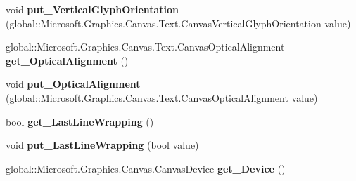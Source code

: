 \begin{DoxyCompactItemize}
\item 
\mbox{\label{class_microsoft_1_1_graphics_1_1_canvas_1_1_text_1_1_canvas_text_layout_a45f5e962fa229c96404257c75c6a3a3c}} 
void {\bfseries put\+\_\+\+Vertical\+Glyph\+Orientation} (global\+::\+Microsoft.\+Graphics.\+Canvas.\+Text.\+Canvas\+Vertical\+Glyph\+Orientation value)
\item 
\mbox{\label{class_microsoft_1_1_graphics_1_1_canvas_1_1_text_1_1_canvas_text_layout_a9de04b11cf865c89c4a76010e49b21ac}} 
global\+::\+Microsoft.\+Graphics.\+Canvas.\+Text.\+Canvas\+Optical\+Alignment {\bfseries get\+\_\+\+Optical\+Alignment} ()
\item 
\mbox{\label{class_microsoft_1_1_graphics_1_1_canvas_1_1_text_1_1_canvas_text_layout_af03396a3ef4783d99224c7d1ed1fb4c8}} 
void {\bfseries put\+\_\+\+Optical\+Alignment} (global\+::\+Microsoft.\+Graphics.\+Canvas.\+Text.\+Canvas\+Optical\+Alignment value)
\item 
\mbox{\label{class_microsoft_1_1_graphics_1_1_canvas_1_1_text_1_1_canvas_text_layout_aa574a94412591998ea88bcf6050fde56}} 
bool {\bfseries get\+\_\+\+Last\+Line\+Wrapping} ()
\item 
\mbox{\label{class_microsoft_1_1_graphics_1_1_canvas_1_1_text_1_1_canvas_text_layout_a23ffd7a9bc9689000496a12211b36095}} 
void {\bfseries put\+\_\+\+Last\+Line\+Wrapping} (bool value)
\item 
\mbox{\label{class_microsoft_1_1_graphics_1_1_canvas_1_1_text_1_1_canvas_text_layout_a63c18a3a380f4b86c17dc06ce7c426e1}} 
global\+::\+Microsoft.\+Graphics.\+Canvas.\+Canvas\+Device {\bfseries get\+\_\+\+Device} ()
\item 
\mbox{\label{class_microsoft_1_1_graphics_1_1_canvas_1_1_text_1_1_canvas_text_layout_aa0d12016b1d9631abf94ebe95eca05a0}} 

\end{DoxyCompactItemize}
